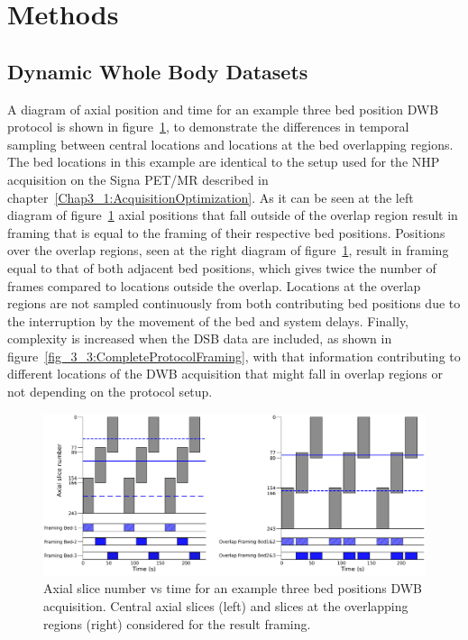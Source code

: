 \section{Methods}
\subsection{Dynamic Whole Body Datasets}
A diagram of axial position and time for an example three bed position DWB protocol is shown in figure~\ref{fig_3_3:OverlapFraming}, to demonstrate the differences in temporal sampling between central locations and locations at the bed overlapping regions. The bed locations in this example are identical to the setup used for the NHP acquisition on the Signa PET/MR described in chapter~\ref{Chap3_1:AcquisitionOptimization}.
As it can be seen at the left diagram of figure~\ref{fig_3_3:OverlapFraming} axial positions that fall outside of the overlap region result in framing that is equal to the framing of their respective bed positions. Positions over the overlap regions, seen at the right diagram of figure~\ref{fig_3_3:OverlapFraming}, result in framing equal to that of both adjacent bed positions, which gives twice the number of frames compared to locations outside the overlap. Locations at the overlap regions are not sampled continuously from both contributing bed positions due to the interruption by the movement of the bed and system delays.  
Finally, complexity is increased when the DSB data are included, as shown in figure~\ref{fig_3_3:CompleteProtocolFraming}, with that information contributing to different locations of the DWB acquisition that might fall in overlap regions or not depending on the protocol setup. 

\begin{figure} [h!]
\centering
\includegraphics[scale=0.50,angle=0]{3_Results/3_3_DWB_Reconstruction/figures/OverlapTiming.pdf}
\caption{Axial slice number vs time for an example three bed positions DWB acquisition. Central axial slices (left) and slices at the overlapping regions (right) considered for the result framing.} 
\label{fig_3_3:OverlapFraming}
\end{figure} 

